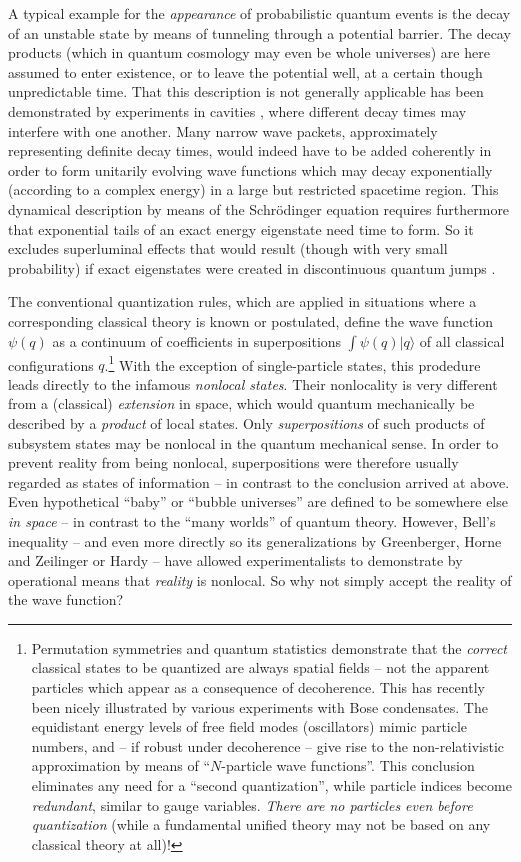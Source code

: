 \documentclass[12pt]{article}
\begin{document}
A typical example for the {\it appearance} of
probabilistic quantum events is the decay of an unstable state by
means of tunneling through a potential barrier. The decay products
(which in quantum cosmology may even be whole universes) are here
assumed to enter existence, or to leave the potential well, at a
certain though unpredictable time. That this description is not
generally applicable has been demonstrated by experiments in cavities
\cite{decay}, where different decay times may interfere with one
another. Many narrow wave packets, approximately representing definite
decay times, would indeed have to be added coherently in order to form
unitarily evolving wave functions which may decay
exponentially (according to
a complex energy) in a large but restricted spacetime region.
This dynamical description by means of the Schr\"odinger equation
requires furthermore that exponential tails of an exact energy
eigenstate need time to form. So it excludes superluminal effects that
would result (though with very small probability) if exact eigenstates
were created in discontinuous quantum jumps
\cite{Hegerfeld}.

The conventional quantization rules, which are applied in
situations where a corresponding classical theory is known or
postulated, define the wave function $\psi(q)$ as a continuum of
coefficients in superpositions $\int\psi(q)|q \rangle$ of all classical
configurations $q$.\footnote{ Permutation symmetries and quantum
statistics demonstrate that the {\it correct} classical states to be
quantized are always spatial fields -- not the apparent
particles which appear as a consequence of decoherence. This has
recently been nicely illustrated by various experiments with Bose
condensates. The equidistant energy levels of free
field modes (oscillators) mimic particle numbers, and -- if robust
under decoherence -- give rise to the non-relativistic approximation by
means of ``$N$-particle wave functions''. This conclusion eliminates
any need for a ``second quantization'', while particle indices become
{\it redundant}, similar to gauge variables. {\it There are no
particles even before quantization} (while a fundamental unified
theory may not be based on any classical theory at all)!} With the
exception of single-particle states, this prodedure leads directly to
the infamous {\it nonlocal states}. Their nonlocality is very
different from a (classical) {\it extension} in space, which would
quantum mechanically be described by a {\it product} of local states.
Only {\it superpositions} of such products of subsystem states may be
nonlocal in the quantum mechanical sense.  In order to prevent reality
from being nonlocal, superpositions were therefore usually regarded as
states of information -- in contrast to the conclusion arrived at
above. Even hypothetical ``baby'' or ``bubble universes'' are defined
to be somewhere else {\it in space} -- in contrast to the ``many
worlds'' of quantum theory. However, Bell's inequality
  -- and
even more directly so its generalizations by Greenberger, Horne and
Zeilinger \cite{GHZ} or Hardy \cite{Hardy} -- have allowed
experimentalists to demonstrate by operational means that {\it reality}
is nonlocal. So why not simply accept the reality of the wave
function?
\end{document}
